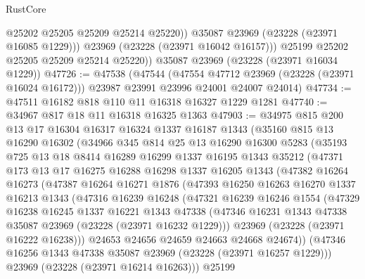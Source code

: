 \begin{lexlean}{RustCore}
\begin{coremodule}
                @25202
                @25205
                @25209
                @25214
                @25220))
            @35087
            @23969
            (@23228 (@23971 @16085 @1229)))
          @23969
          (@23228 (@23971 @16042 @16157)))
        @25199
        @25202
        @25205
        @25209
        @25214
        @25220))
    @35087
    @23969
    (@23228 (@23971 @16034 @1229))
@47726 := @47538
    (@47544
      (@47554 @47712 @23969 (@23228 (@23971 @16024 @16172)))
      @23987
      @23991
      @23996
      @24001
      @24007
      @24014)
@47734 := @47511 @16182 @818 @110 @11 @16318 @16327 @1229 @1281
@47740 := @34967 @817 @18 @11 @16318 @16325 @1363
@47903 := @34975
    @815
    @200
    @13
    @17
    @16304
    @16317
    @16324
    @1337
    @16187
    @1343
    (@35160
      @815
      @13
      @16290
      @16302
      (@34966
        @345
        @814
        @25
        @13
        @16290
        @16300
        @5283
        (@35193
          @725
          @13
          @18
          @8414
          @16289
          @16299
          @1337
          @16195
          @1343
          @35212
          (@47371
            @173
            @13
            @17
            @16275
            @16288
            @16298
            @1337
            @16205
            @1343
            (@47382
              @16264
              @16273
              (@47387
                @16264
                @16271
                @1876
                (@47393
                  @16250
                  @16263
                  @16270
                  @1337
                  @16213
                  @1343
                  (@47316
                    @16239
                    @16248
                    (@47321
                      @16239
                      @16246
                      @1554
                      (@47329
                        @16238
                        @16245
                        @1337
                        @16221
                        @1343
                        @47338
                        (@47346 @16231 @1343 @47338 @35087 @23969 (@23228 (@23971 @16232 @1229)))
                        @23969
                        (@23228 (@23971 @16222 @16238)))
                      @24653
                      @24656
                      @24659
                      @24663
                      @24668
                      @24674))
                  (@47346 @16256 @1343 @47338 @35087 @23969 (@23228 (@23971 @16257 @1229)))
                  @23969
                  (@23228 (@23971 @16214 @16263)))
                @25199

\end{coremodule}
\end{lexlean}
